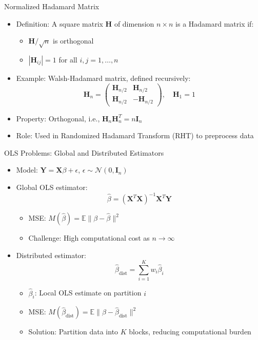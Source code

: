 \documentclass{beamer}
\theoremstyle{remark}
\begin{document}
\begin{frame}{Normalized Hadamard Matrix}
  \begin{itemize}
    \item Definition: A square matrix \( \mathbf{H} \) of dimension \( n \times n \) is a Hadamard matrix if:
      \begin{itemize}
        \item \( \mathbf{H} / \sqrt{n} \) is orthogonal
        \item \( |\mathbf{H}_{ij}| = 1 \) for all \( i, j = 1, \ldots, n \)
      \end{itemize}
    \item Example: Walsh-Hadamard matrix, defined recursively:
      \[
      \mathbf{H}_n = \begin{pmatrix} \mathbf{H}_{n/2} & \mathbf{H}_{n/2} \\ \mathbf{H}_{n/2} & -\mathbf{H}_{n/2} \end{pmatrix}, \quad \mathbf{H}_1 = 1
      \]
    \item Property: Orthogonal, i.e., \( \mathbf{H}_n \mathbf{H}_n^T = n \mathbf{I}_n \)
    \item Role: Used in Randomized Hadamard Transform (RHT) to preprocess data
  \end{itemize}
\end{frame}

\begin{frame}{OLS Problems: Global and Distributed Estimators}
  \begin{itemize}
    \item Model: \( \mathbf{Y} = \mathbf{X} \beta + \epsilon \), \( \epsilon \sim \mathcal{N}(0, \mathbf{I}_n) \)
    \item Global OLS estimator:
      \[
      \hat{\beta} = (\mathbf{X}^T \mathbf{X})^{-1} \mathbf{X}^T \mathbf{Y}
      \]
      \begin{itemize}
        \item MSE: \( M(\hat{\beta}) = \mathbb{E} \|\beta - \hat{\beta}\|^2 \)
        \item Challenge: High computational cost as \( n \to \infty \)
      \end{itemize}
    \item Distributed estimator:
      \[
      \hat{\beta}_{\text{dist}} = \sum_{i=1}^K w_i \hat{\beta}_i
      \]
      \begin{itemize}
        \item \( \hat{\beta}_i \): Local OLS estimate on partition \( i \)
        \item MSE: \( M(\hat{\beta}_{\text{dist}}) = \mathbb{E} \|\beta - \hat{\beta}_{\text{dist}}\|^2 \)
        \item Solution: Partition data into \( K \) blocks, reducing computational burden
      \end{itemize}
  \end{itemize}
\end{frame}
\end{document}
